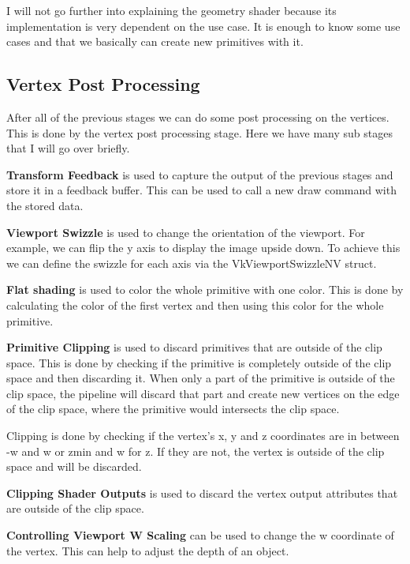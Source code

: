 \documentclass[12pt]{report} \usepackage{preamble}
\begin{document}
I will not go further into explaining the geometry shader because its
implementation is very dependent on the use case. It is enough to know
some use cases and that we basically can create new primitives with it.

\subsection{Vertex Post Processing}

After all of the previous stages we can do some post processing on the vertices.
This is done by the vertex post processing stage.
Here we have many sub stages that I will go over briefly.

\textbf{Transform Feedback} is used to capture the output of the previous stages
and store it in a feedback buffer. This can be used to
call a new draw command with the stored data. \cite{vertex-post-processing}

\textbf{Viewport Swizzle} is used to change the orientation of the viewport.
For example, we can flip the y axis to display the image upside down.
To achieve this we can define the swizzle for each axis via the VkViewportSwizzleNV struct. \cite{vertex-post-processing}

\textbf{Flat shading} is used to color the whole primitive with one color.
This is done by calculating the color of the first vertex and then
using this color for the whole primitive. \cite{vertex-post-processing}

\textbf{Primitive Clipping} is used to discard primitives that are outside of the clip space.
This is done by checking if the primitive is
completely outside of the clip space and then discarding it. \cite{vertex-post-processing}
When only a part of the primitive is outside of the clip space,
the pipeline will discard that part and create new vertices on the edge of the clip space,
where the primitive would intersects the clip space. \cite{vertex-post-processing}

Clipping is done by checking if the vertex's x, y and z coordinates
are in between -w and w or z\textunderscore min and w for z.
If they are not, the vertex is outside of the clip space and will be discarded.

\textbf{Clipping Shader Outputs} is used to discard the vertex output attributes
that are outside of the clip space.

\textbf{Controlling Viewport W Scaling} can be used to change the w coordinate of the vertex.
This can help to adjust the depth of an object.
\end{document}
